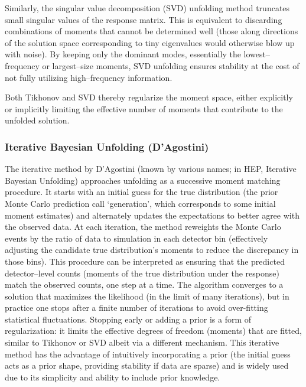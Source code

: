             Similarly, the singular value decomposition (SVD) unfolding method truncates small singular values of the response matrix.
            This is equivalent to discarding combinations of moments that cannot be determined well (those along directions of the solution space corresponding to tiny eigenvalues would otherwise blow up with noise).
            By keeping only the dominant modes, essentially the lowest--frequency or largest--size moments, SVD unfolding ensures stability at the cost of not fully utilizing high--frequency information.
            
            Both Tikhonov and SVD thereby regularize the moment space, either explicitly or implicitly limiting the effective number of moments that contribute to the unfolded solution.
        \subsubsection{Iterative Bayesian Unfolding (D’Agostini)}
            The iterative method by D’Agostini (known by various names; in HEP, Iterative Bayesian Unfolding) approaches unfolding as a successive moment matching procedure.
            It starts with an initial guess for the true distribution (the prior Monte Carlo prediction call `generation', which corresponds to some initial moment estimates) and alternately updates the expectations to better agree with the observed data.
            At each iteration, the method reweights the Monte Carlo events by the ratio of data to simulation in each detector bin (effectively adjusting the candidate true distribution’s moments to reduce the discrepancy in those bins).
            This procedure can be interpreted as ensuring that the predicted detector--level counts (moments of the true distribution under the response) match the observed counts, one step at a time.
            The algorithm converges to a solution that maximizes the likelihood (in the limit of many iterations), but in practice one stops after a finite number of iterations to avoid over-fitting statistical fluctuations.
            Stopping early or adding a prior is a form of regularization: it limits the effective degrees of freedom (moments) that are fitted, similar to Tikhonov or SVD albeit via a different mechanism.
            This iterative method has the advantage of intuitively incorporating a prior (the initial guess acts as a prior shape, providing stability if data are sparse) and is widely used due to its simplicity and ability to include prior knowledge.
        
